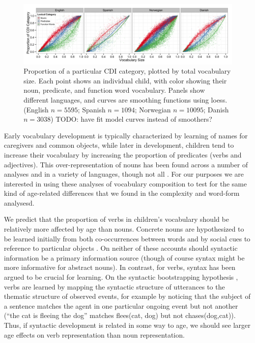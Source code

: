 \documentclass[10pt,letterpaper]{article}
\begin{document}
\begin{figure}[!bh]
\begin{center}
\includegraphics[width=\textwidth]{plots/composition.png}
\end{center}
\caption{\label{fig:vocab_comp} Proportion of a particular CDI category, plotted by total vocabulary size. Each point shows an individual child, with color showing their noun, predicate, and function word vocabulary. Panels show different languages, and curves are smoothing functions using loess. (English $n=5595$; Spanish $n=1094$; Norwegian $n=10095$; Danish $n=3038$) TODO: have fit model curves instead of smoothers?} 
\end{figure}

Early vocabulary development is typically characterized by learning of names for caregivers and common objects, while later in development, children tend to increase their vocabulary by increasing the proportion of predicates (verbs and adjectives). This over-representation of nouns has been found across a number of analyses and in a variety of languages, though not all \cite{caselli1995}.
For our purposes we are interested in using these analyses of vocabulary composition to test for the same kind of age-related differences that we found in the complexity and word-form analysesd. 

We predict that the proportion of verbs in children's vocabulary should be relatively more affected by age than nouns. Concrete nouns are hypothesized to be learned initially from both co-occurrences between words \cite{yu2007b} and by social cues to reference to particular objects \cite{bloom2002}. On neither of these accounts should syntactic information be a primary information source (though of course syntax might be more informative for abstract nouns). In contrast, for verbs, syntax has been argued to be crucial for learning. On the syntactic bootstrapping hypothesis \cite{gleitman1990,fisher1991}, verbs are learned by  mapping the syntactic structure of utterances to the thematic structure of observed events, for example by noticing that the subject of a sentence matches the agent in one particular ongoing event but not another (``the cat is fleeing the dog'' matches  {\sc flees(cat, dog)} but not {\sc chases(dog,cat)}). Thus, if syntactic development is related in some way to age, we should see larger age effects on verb representation than noun representation. 
\end{document}
